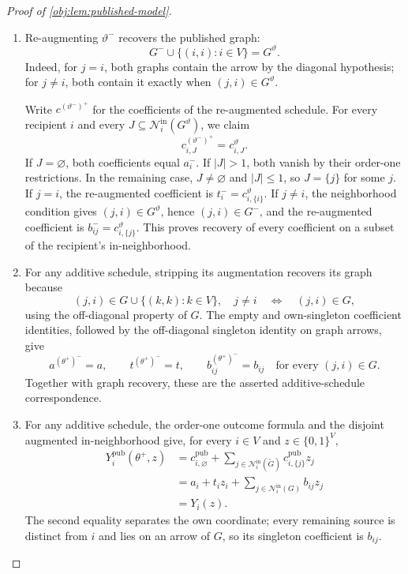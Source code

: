 \begin{proof}[Proof of \cref{obj:lem:published-model}]
\begin{enumerate}
\item Re-augmenting \(\vartheta^-\) recovers the published graph:
\[
G^-\cup\{(i,i):i\in V\}=G^\vartheta.
\]
Indeed, for \(j=i\), both graphs contain the arrow by the diagonal hypothesis; for \(j\ne i\), both contain it exactly when \((j,i)\in G^\vartheta\).

Write \(c^{(\vartheta^-)^+}\) for the coefficients of the re-augmented schedule. For every recipient \(i\) and every
\(J\subseteq\mathcal N^{\mathrm{in}}_i(G^\vartheta)\), we claim
\[
c^{(\vartheta^-)^+}_{i,J}=c^\vartheta_{i,J}.
\]
If \(J=\varnothing\), both coefficients equal \(a_i^-\).
If \(|J|>1\), both vanish by their order-one restrictions.
In the remaining case, \(J\ne\varnothing\) and \(|J|\le1\), so \(J=\{j\}\) for some \(j\). If \(j=i\), the re-augmented coefficient is
\(t_i^-=c^\vartheta_{i,\{i\}}\). If \(j\ne i\), the neighborhood condition gives
\((j,i)\in G^\vartheta\), hence \((j,i)\in G^-\), and the re-augmented coefficient is
\(b_{ij}^-=c^\vartheta_{i,\{j\}}\).
This proves recovery of every coefficient on a subset of the recipient's in-neighborhood.

\item For any additive schedule, stripping its augmentation recovers its graph because
\[
(j,i)\in G\cup\{(k,k):k\in V\},\quad j\ne i
\quad\Longleftrightarrow\quad
(j,i)\in G,
\]
using the off-diagonal property of \(G\). The empty and own-singleton coefficient identities, followed by the off-diagonal singleton identity on graph arrows, give
\[
a^{(\theta^+)^-}=a,\qquad
t^{(\theta^+)^-}=t,\qquad
b^{(\theta^+)^-}_{ij}=b_{ij}
\quad\text{for every }(j,i)\in G.
\]
Together with graph recovery, these are the asserted additive-schedule correspondence.

\item For any additive schedule, the order-one outcome formula and the disjoint augmented in-neighborhood give, for every \(i\in V\) and \(z\in\{0,1\}^V\),
\[
\begin{aligned}
Y_i^{\mathrm{pub}}(\theta^+,z)
&=
c^{\mathrm{pub}}_{i,\varnothing}
+\sum_{j\in\mathcal N^{\mathrm{in}}_i(\widetilde G)}
c^{\mathrm{pub}}_{i,\{j\}}z_j\\
&=
a_i+t_i z_i
+\sum_{j\in\mathcal N^{\mathrm{in}}_i(G)}b_{ij}z_j\\
&=Y_i(z).
\end{aligned}
\]
The second equality separates the own coordinate; every remaining source is distinct from \(i\) and lies on an arrow of \(G\), so its singleton coefficient is \(b_{ij}\).


\end{enumerate}
\end{proof}
